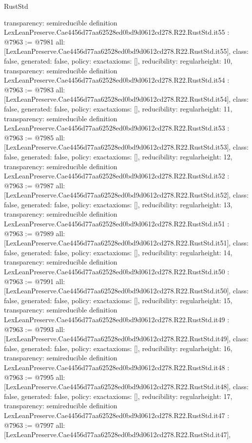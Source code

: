 \begin{lexlean}{RustStd}
\begin{coremodule}
{  transparency: semireducible
}
definition LexLeanPreserve.Cae4456d77aa62528ed0bd9d0612cd278.R22.RustStd.it55 : @7963 := @7981 {
  all: [LexLeanPreserve.Cae4456d77aa62528ed0bd9d0612cd278.R22.RustStd.it55],
  class: false,
  generated: false,
  policy: exact{axioms: []},
  reducibility: regular{height: 10},
  transparency: semireducible
}
definition LexLeanPreserve.Cae4456d77aa62528ed0bd9d0612cd278.R22.RustStd.it54 : @7963 := @7983 {
  all: [LexLeanPreserve.Cae4456d77aa62528ed0bd9d0612cd278.R22.RustStd.it54],
  class: false,
  generated: false,
  policy: exact{axioms: []},
  reducibility: regular{height: 11},
  transparency: semireducible
}
definition LexLeanPreserve.Cae4456d77aa62528ed0bd9d0612cd278.R22.RustStd.it53 : @7963 := @7985 {
  all: [LexLeanPreserve.Cae4456d77aa62528ed0bd9d0612cd278.R22.RustStd.it53],
  class: false,
  generated: false,
  policy: exact{axioms: []},
  reducibility: regular{height: 12},
  transparency: semireducible
}
definition LexLeanPreserve.Cae4456d77aa62528ed0bd9d0612cd278.R22.RustStd.it52 : @7963 := @7987 {
  all: [LexLeanPreserve.Cae4456d77aa62528ed0bd9d0612cd278.R22.RustStd.it52],
  class: false,
  generated: false,
  policy: exact{axioms: []},
  reducibility: regular{height: 13},
  transparency: semireducible
}
definition LexLeanPreserve.Cae4456d77aa62528ed0bd9d0612cd278.R22.RustStd.it51 : @7963 := @7989 {
  all: [LexLeanPreserve.Cae4456d77aa62528ed0bd9d0612cd278.R22.RustStd.it51],
  class: false,
  generated: false,
  policy: exact{axioms: []},
  reducibility: regular{height: 14},
  transparency: semireducible
}
definition LexLeanPreserve.Cae4456d77aa62528ed0bd9d0612cd278.R22.RustStd.it50 : @7963 := @7991 {
  all: [LexLeanPreserve.Cae4456d77aa62528ed0bd9d0612cd278.R22.RustStd.it50],
  class: false,
  generated: false,
  policy: exact{axioms: []},
  reducibility: regular{height: 15},
  transparency: semireducible
}
definition LexLeanPreserve.Cae4456d77aa62528ed0bd9d0612cd278.R22.RustStd.it49 : @7963 := @7993 {
  all: [LexLeanPreserve.Cae4456d77aa62528ed0bd9d0612cd278.R22.RustStd.it49],
  class: false,
  generated: false,
  policy: exact{axioms: []},
  reducibility: regular{height: 16},
  transparency: semireducible
}
definition LexLeanPreserve.Cae4456d77aa62528ed0bd9d0612cd278.R22.RustStd.it48 : @7963 := @7995 {
  all: [LexLeanPreserve.Cae4456d77aa62528ed0bd9d0612cd278.R22.RustStd.it48],
  class: false,
  generated: false,
  policy: exact{axioms: []},
  reducibility: regular{height: 17},
  transparency: semireducible
}
definition LexLeanPreserve.Cae4456d77aa62528ed0bd9d0612cd278.R22.RustStd.it47 : @7963 := @7997 {
  all: [LexLeanPreserve.Cae4456d77aa62528ed0bd9d0612cd278.R22.RustStd.it47],
}
\end{coremodule}
\end{lexlean}
